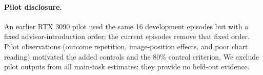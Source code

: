 \documentclass[letterpaper]{article} %
\begin{document}
\paragraph{Pilot disclosure.} An earlier RTX 3090 pilot used the same 16 development episodes but with a fixed advisor-introduction order; the current episodes remove that fixed order. Pilot observations (outcome repetition, image-position effects, and poor chart reading) motivated the added controls and the 80\% control criterion. We exclude pilot outputs from all main-task estimates; they provide no held-out evidence.
\end{document}
